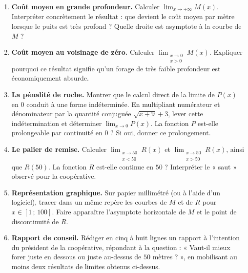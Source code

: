 \documentclass[11pt]{article}
\newcounter{popsec}
\newcounter{popsub}
\newcommand{\courssub}[1]{%
  \stepcounter{popsub}%
  \par\vspace{9pt}\noindent{\popxbold\fontsize{11.5}{13}\selectfont\color{popink}{\color{poporange}\thepopsec.\thepopsub}\hspace{6pt}#1}\par\nopagebreak\vspace{4pt}
}
\begin{document}
\begin{enumerate}
\item \textbf{Coût moyen en grande profondeur.} Calculer $\displaystyle\lim_{x \to +\infty} M(x)$. Interpréter concrètement le résultat : que devient le coût moyen par mètre lorsque le puits est très profond ? Quelle droite est asymptote à la courbe de $M$ ?
\item \textbf{Coût moyen au voisinage de zéro.} Calculer $\displaystyle\lim_{\substack{x \to 0 \\ x > 0}} M(x)$. Expliquer pourquoi ce résultat signifie qu'un forage de très faible profondeur est économiquement absurde.
\item \textbf{La pénalité de roche.} Montrer que le calcul direct de la limite de $P(x)$ en $0$ conduit à une forme indéterminée. En multipliant numérateur et dénominateur par la quantité conjuguée $\sqrt{x+9}+3$, lever cette indétermination et déterminer $\displaystyle\lim_{x \to 0} P(x)$. La fonction $P$ est-elle prolongeable par continuité en $0$ ? Si oui, donner ce prolongement.
\item \textbf{Le palier de remise.} Calculer $\displaystyle\lim_{\substack{x \to 50 \\ x < 50}} R(x)$ et $\displaystyle\lim_{\substack{x \to 50 \\ x > 50}} R(x)$, ainsi que $R(50)$. La fonction $R$ est-elle continue en $50$ ? Interpréter le « saut » observé pour la coopérative.
\item \textbf{Représentation graphique.} Sur papier millimétré (ou à l'aide d'un logiciel), tracer dans un même repère les courbes de $M$ et de $R$ pour $x \in [1\,;\,100]$. Faire apparaître l'asymptote horizontale de $M$ et le point de discontinuité de $R$.
\item \textbf{Rapport de conseil.} Rédiger en cinq à huit lignes un rapport à l'intention du président de la coopérative, répondant à la question : « Vaut-il mieux forer juste en dessous ou juste au-dessus de $50$ mètres ? », en mobilisant au moins deux résultats de limites obtenus ci-dessus.
\end{enumerate}

\courssub{Ressources à mobiliser}
\end{document}
